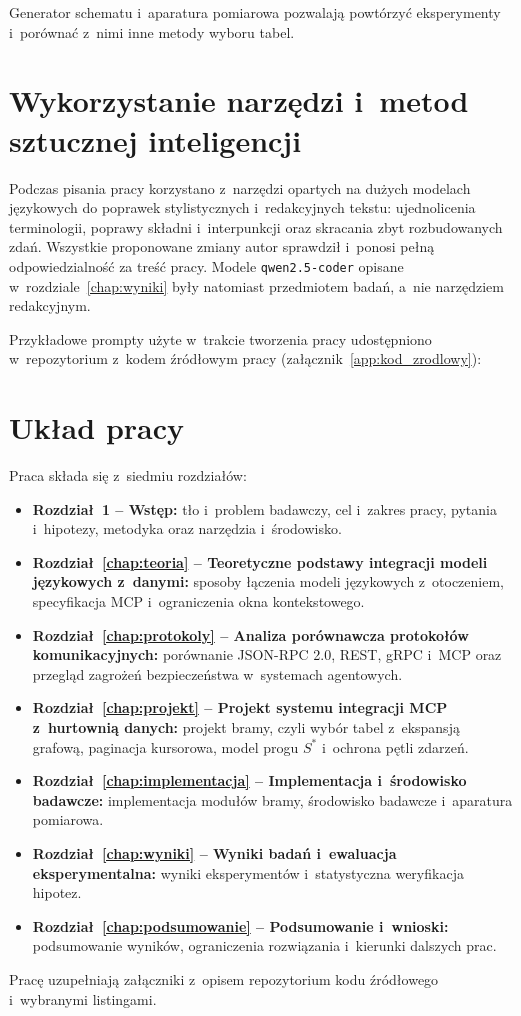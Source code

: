 Generator schematu i~aparatura pomiarowa pozwalają powtórzyć eksperymenty i~porównać z~nimi inne metody wyboru tabel.


\section{Wykorzystanie narzędzi i~metod sztucznej inteligencji}
\label{sec:wstep_ai}

Podczas pisania pracy korzystano z~narzędzi opartych na dużych modelach językowych do poprawek stylistycznych i~redakcyjnych tekstu: ujednolicenia terminologii, poprawy składni i~interpunkcji oraz skracania zbyt rozbudowanych zdań. Wszystkie proponowane zmiany autor sprawdził i~ponosi pełną odpowiedzialność za treść pracy. Modele \texttt{qwen2.5-coder} opisane w~rozdziale~\ref{chap:wyniki} były natomiast przedmiotem badań, a~nie narzędziem redakcyjnym.

Przykładowe prompty użyte w~trakcie tworzenia pracy udostępniono w~repozytorium z~kodem źródłowym pracy (załącznik~\ref{app:kod_zrodlowy}):
\begin{center}
\repoUrl
\end{center}


\section{Układ pracy}
\label{sec:wstep_uklad_pracy}

Praca składa się z~siedmiu rozdziałów:
\begin{itemize}
    \item \textbf{Rozdział~1 -- Wstęp:} tło i~problem badawczy, cel i~zakres pracy, pytania i~hipotezy, metodyka oraz narzędzia i~środowisko.
    \item \textbf{Rozdział~\ref{chap:teoria} -- Teoretyczne podstawy integracji modeli językowych z~danymi:} sposoby łączenia modeli językowych z~otoczeniem, specyfikacja MCP i~ograniczenia okna kontekstowego.
    \item \textbf{Rozdział~\ref{chap:protokoly} -- Analiza porównawcza protokołów komunikacyjnych:} porównanie JSON-RPC 2.0, REST, gRPC i~MCP oraz przegląd zagrożeń bezpieczeństwa w~systemach agentowych.
    \item \textbf{Rozdział~\ref{chap:projekt} -- Projekt systemu integracji MCP z~hurtownią danych:} projekt bramy, czyli wybór tabel z~ekspansją grafową, paginacja kursorowa, model progu $S^*$ i~ochrona pętli zdarzeń.
    \item \textbf{Rozdział~\ref{chap:implementacja} -- Implementacja i~środowisko badawcze:} implementacja modułów bramy, środowisko badawcze i~aparatura pomiarowa.
    \item \textbf{Rozdział~\ref{chap:wyniki} -- Wyniki badań i~ewaluacja eksperymentalna:} wyniki eksperymentów i~statystyczna weryfikacja hipotez.
    \item \textbf{Rozdział~\ref{chap:podsumowanie} -- Podsumowanie i~wnioski:} podsumowanie wyników, ograniczenia rozwiązania i~kierunki dalszych prac.
\end{itemize}
Pracę uzupełniają załączniki z~opisem repozytorium kodu źródłowego i~wybranymi listingami.
